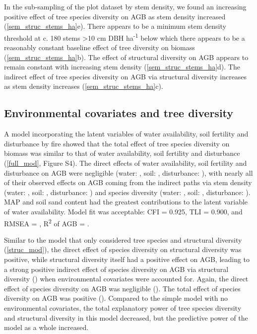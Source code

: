 \documentclass[12pt,a4paper]{article}
\begin{document}
In the sub-sampling of the plot dataset by stem density, we found an increasing positive effect of tree species diversity on AGB as stem density increased (\autoref{sem_struc_stems_ha}e). There appears to be a minimum stem density threshold at c. 180 stems >10 cm DBH ha\textsuperscript{-1} below which there appears to be a reasonably constant baseline effect of tree diversity on biomass (\autoref{sem_struc_stems_ha}b). The effect of structural diversity on AGB appears to remain constant with increasing stem density (\autoref{sem_struc_stems_ha}d). The indirect effect of tree species diversity on AGB via structural diversity increases as stem density increases (\autoref{sem_struc_stems_ha}c). 


\subsection{Environmental covariates and tree diversity}

A model incorporating the latent variables of water availability, soil fertility and disturbance by fire showed that the total effect of tree species diversity on biomass was similar to that of water availability, soil fertility and disturbance (\autoref{full_mod}, Figure S4). The direct effects of water availability, soil fertility and disturbance on AGB were negligible (water: \fmbetamb{}, soil: \fmbetasb{}, disturbance: \fmbetafb{}), with nearly all of their observed effects on AGB coming from the indirect paths via stem density (water: \fmbetamib{}, soil: \fmbetasib{}, disturbance: \fmbetafib{}) and species diversity (water: \fmbetamd{}, soil: \fmbetasd{}, disturbance: \fmbetafd{}). MAP and soil sand content had the greatest contributions to the latent variable of water availability. Model fit was acceptable: CFI = 0.925, TLI = 0.900, and RMSEA = \fmrmsea{}, R\textsuperscript{2} of AGB = \fmrsq{}. 

Similar to the model that only considered tree species and structural diversity (\autoref{struc_mod}), the direct effect of species diversity on structural diversity was positive, while structural diversity itself had a positive effect on AGB, leading to a strong positive indirect effect of species diversity on AGB via structural diversity (\fmbetadhb{}) when environmental covariates were accounted for. Again, the direct effect of species diversity on AGB was negligible (\fmbetadb{}). The total effect of species diversity on AGB was positive (\fmbetatotaldb{}). Compared to the simple model with no environmental covariates, the total explanatory power of tree species diversity and structural diversity in this model decreased, but the predictive power of the model as a whole increased.
\end{document}
